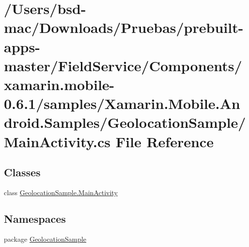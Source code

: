 \hypertarget{xamarin_8mobile-0_86_81_2samples_2_xamarin_8_mobile_8_android_8_samples_2_geolocation_sample_2_main_activity_8cs}{\section{/\+Users/bsd-\/mac/\+Downloads/\+Pruebas/prebuilt-\/apps-\/master/\+Field\+Service/\+Components/xamarin.mobile-\/0.6.1/samples/\+Xamarin.Mobile.\+Android.\+Samples/\+Geolocation\+Sample/\+Main\+Activity.cs File Reference}
\label{xamarin_8mobile-0_86_81_2samples_2_xamarin_8_mobile_8_android_8_samples_2_geolocation_sample_2_main_activity_8cs}
}
\subsection*{Classes}
\begin{DoxyCompactItemize}
\item 
class \hyperlink{class_geolocation_sample_1_1_main_activity}{Geolocation\+Sample.\+Main\+Activity}
\end{DoxyCompactItemize}
\subsection*{Namespaces}
\begin{DoxyCompactItemize}
\item 
package \hyperlink{namespace_geolocation_sample}{Geolocation\+Sample}
\end{DoxyCompactItemize}
